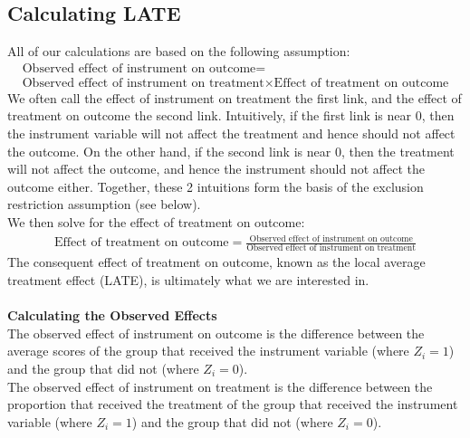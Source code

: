 \documentclass{article}
\begin{document}
\subsection{Calculating LATE}
All of our calculations are based on the following assumption: 
\begin{gather*}
\textrm{Observed effect of instrument on outcome} = \\\textrm{Observed effect of instrument on treatment} \times \textrm{Effect of treatment on outcome}
\end{gather*}
We often call the effect of instrument on treatment the first link, and the effect of treatment on outcome the second link. Intuitively, if the first link is near 0, then the instrument variable will not affect the treatment and hence should not affect the outcome.
On the other hand, if the second link is near 0, then the treatment will not affect the outcome, and hence the instrument should not affect the outcome either. 
Together, these 2 intuitions form the basis of the exclusion restriction assumption (see below). 
\\
We then solve for the effect of treatment on outcome:
\begin{gather*}
\textrm{Effect of treatment on outcome} = \frac{\textrm{Observed effect of instrument on outcome}}{\textrm{Observed effect of instrument on treatment}}
\end{gather*}
The consequent effect of treatment on outcome, known as the local average treatment effect (LATE), is ultimately what we are interested in.
\\\\
\textbf{Calculating the Observed Effects}
\\
The observed effect of instrument on outcome is the difference between the average scores of the group that received the instrument variable (where $Z_i = 1$) and the group that did not (where $Z_i = 0$).
\\
The observed effect of instrument on treatment is the difference between the proportion that received the treatment of the group that received the instrument variable (where $Z_i = 1$) and the group that did not (where $Z_i = 0$).
\end{document}
